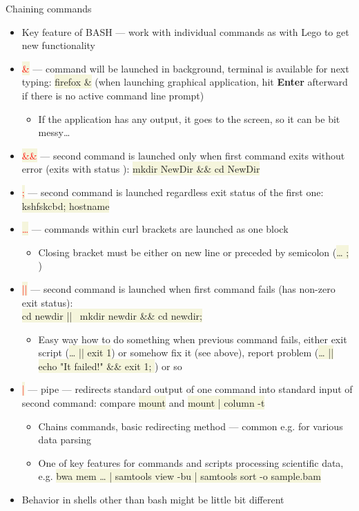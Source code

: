 \documentclass[compress, xelatex, 11pt, xcolor=svgnames, aspectratio=169,
	hyperref={
		bookmarks=true,
		unicode=true,
		colorlinks=true,
		pdftitle={Linux, command line and MetaCentrum},
		plainpages=false,
		pdfauthor={Vojtech Zeisek},
		pdfsubject={Course about use of Linux command line, writing shell scripts and using MetaCentrum of CESNET},
		pdfcreator={XeLaTeX},
		pdfkeywords={Linux, GNU, BASH, shell, command line, MetaCentrum},
		linkcolor=DarkRed, %
		anchorcolor=DarkBlue, %
		citecolor=Indigo, %
		filecolor=NavyBlue, %
		menucolor=DarkMagenta, %
		urlcolor=DarkBlue, %
		},
	url={hyphens, lowtilde} %
	]{beamer}
\renewcommand{\texttt}[1]{\colorbox{Beige}{{\ttfamily #1}}}
\renewcommand{\alert}[1]{\textcolor{red}{#1}}
\begin{document}
\begin{frame}[allowframebreaks]{Chaining commands}
	\begin{itemize}
		\item Key feature of BASH --- work with individual commands as with Lego to get new functionality
		\item \alert{\texttt{\&}} --- command will be launched in background, terminal is available for next typing: \texttt{firefox \&} (when launching graphical application, hit \textbf{Enter} afterward if there is no active command line prompt)
		\begin{itemize}
			\item If the application has any output, it goes to the screen, so it can be bit messy\ldots
		\end{itemize}
		\item \alert{\texttt{\&\&}} --- second command is launched only when first command exits without error (exits with status \texttt{0}): \texttt{mkdir NewDir \&\& cd NewDir}
		\item \alert{\texttt{;}} --- second command is launched regardless exit status of the first one: \texttt{kshfskcbd; hostname}
		\item \alert{\texttt{\textbraceleft\ldots\textbraceright}} --- commands within curl brackets are launched as one block
		\begin{itemize}
			\item Closing bracket \texttt{\textbraceright} must be either on new line or preceded by semicolon (\texttt{\ldots{ }; \textbraceright})
		\end{itemize}
		\item \alert{\texttt{||}} --- second command is launched when first command fails (has non-zero exit status):\\\texttt{cd newdir || \textbraceleft~mkdir newdir \&\& cd newdir; \textbraceright}
		\begin{itemize}
			\item Easy way how to do something when previous command fails, either exit script (\texttt{\ldots{ }|| exit 1}) or somehow fix it (see above), report problem (\texttt{\ldots{ }|| \textbraceleft echo "It failed!" \&\& exit 1; \textbraceright}) or so
		\end{itemize}
		\item \alert{\texttt{|}} --- pipe --- redirects standard output of one command into standard input of second command: compare \texttt{mount} and \texttt{mount | column -t}
		\begin{itemize}
			\item Chains commands, basic redirecting method --- common e.g. for various data parsing
			\item One of key features for commands and scripts processing scientific data, e.g. \texttt{bwa mem \ldots{ }| samtools view -bu | samtools sort -o sample.bam}
		\end{itemize}
		\item Behavior in shells other than bash might be little bit different
	\end{itemize}
\end{frame}
\end{document}
